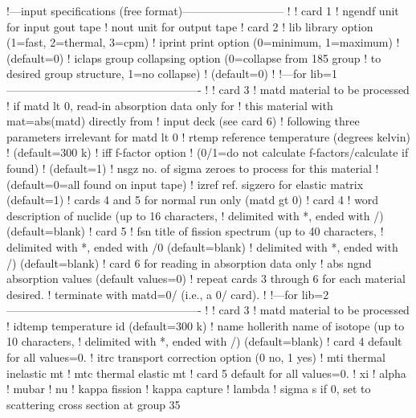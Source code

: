 \small
\begin{ccode}

   !---input specifications (free format)---------------------------
   !
   ! card 1
   !    ngendf  unit for input gout tape
   !    nout    unit for output tape
   ! card 2
   !    lib     library option (1=fast, 2=thermal, 3=cpm)
   !    iprint  print option (0=minimum, 1=maximum)
   !            (default=0)
   !    iclaps  group collapsing option (0=collapse from 185 group
   !            to desired group structure, 1=no collapse)
   !            (default=0)
   !
   !---for lib=1----------------------------------------------------
   !
   ! card 3
   !    matd    material to be processed
   !            if matd lt 0, read-in absorption data only for
   !            this material with mat=abs(matd) directly from
   !            input deck (see card 6)
   !   following three parameters irrelevant for matd lt 0
   !    rtemp   reference temperature (degrees kelvin)
   !            (default=300  k)
   !    iff     f-factor option
   !            (0/1=do not calculate f-factors/calculate if found)
   !            (default=1)
   !    nsgz    no. of sigma zeroes to process for this material
   !            (default=0=all found on input tape)
   !    izref   ref. sigzero for elastic matrix (default=1)
   ! cards 4 and 5 for normal run only (matd gt 0)
   ! card 4
   !    word    description of nuclide (up to 16 characters,
   !            delimited with *, ended with /)  (default=blank)
   ! card 5
   !    fsn     title of fission spectrum (up to 40 characters,
   !            delimited with *, ended with /0  (default=blank)
   !             delimited with *, ended with /)  (default=blank)
   ! card 6 for reading in absorption data only
   !    abs     ngnd absorption values (default values=0)
   ! repeat cards 3 through 6 for each material desired.
   ! terminate with matd=0/ (i.e., a 0/ card).
   !
   !---for lib=2----------------------------------------------------
   !
   ! card 3
   !    matd    material to be processed
   !    idtemp  temperature id (default=300  k)
   !    name    hollerith name of isotope (up to 10 characters,
   !            delimited with *, ended with /)  (default=blank)
   ! card 4     default for all values=0.
   !    itrc    transport correction option (0 no, 1 yes)
   !    mti     thermal inelastic mt
   !    mtc     thermal elastic mt
   ! card 5     default for all values=0.
   !    xi
   !    alpha
   !    mubar
   !    nu
   !    kappa fission
   !    kappa capture
   !    lambda
   !    sigma s   if 0, set to scattering cross section at group 35

\end{ccode}
